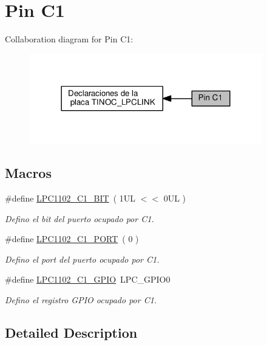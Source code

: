 \hypertarget{group___p_i_n_c1}{}\section{Pin C1}
\label{group___p_i_n_c1}
Collaboration diagram for Pin C1\+:\nopagebreak
\begin{figure}[H]
\begin{center}
\leavevmode
\includegraphics[width=288pt]{group___p_i_n_c1}
\end{center}
\end{figure}
\subsection*{Macros}
\begin{DoxyCompactItemize}
\item 
\#define \hyperlink{group___p_i_n_c1_gac6a22e60c760c46ea90fb0ebe728baa1}{L\+P\+C1102\+\_\+\+C1\+\_\+\+B\+IT}~( 1\+U\+L $<$$<$ 0\+U\+L )
\begin{DoxyCompactList}\small\item\em Defino el bit del puerto ocupado por C1. \end{DoxyCompactList}\item 
\#define \hyperlink{group___p_i_n_c1_ga858dd06436643c005fd1f54e54091e82}{L\+P\+C1102\+\_\+\+C1\+\_\+\+P\+O\+RT}~( 0 )
\begin{DoxyCompactList}\small\item\em Defino el port del puerto ocupado por C1. \end{DoxyCompactList}\item 
\#define \hyperlink{group___p_i_n_c1_gae77ae547e9f51dd166db043d9c2ab9ea}{L\+P\+C1102\+\_\+\+C1\+\_\+\+G\+P\+IO}~L\+P\+C\+\_\+\+G\+P\+I\+O0
\begin{DoxyCompactList}\small\item\em Defino el registro G\+P\+IO ocupado por C1. \end{DoxyCompactList}\end{DoxyCompactItemize}


\subsection{Detailed Description}


